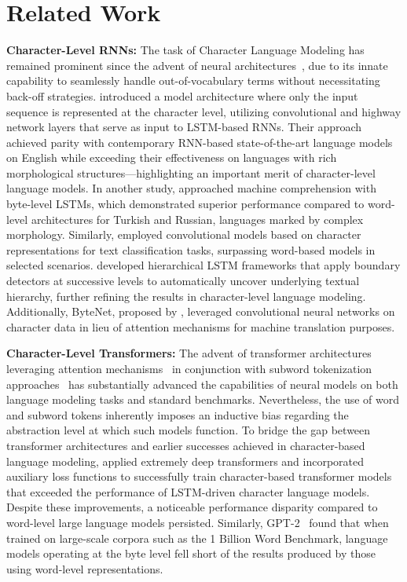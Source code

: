 \section{Related Work}
\label{section:related_work}

\textbf{Character-Level RNNs:} The task of Character Language Modeling has remained prominent since the advent of neural architectures~\citep{sutskever2011generating,mikolov2012subword,graves2013generating}, due to its innate capability to seamlessly handle out-of-vocabulary terms without necessitating back-off strategies. \cite{kim2016character} introduced a model architecture where only the input sequence is represented at the character level, utilizing convolutional and highway network layers that serve as input to LSTM-based RNNs. Their approach achieved parity with contemporary RNN-based state-of-the-art language models on English while exceeding their effectiveness on languages with rich morphological structures—highlighting an important merit of character-level language models. In another study, \cite{kenter2018byte} approached machine comprehension with byte-level LSTMs, which demonstrated superior performance compared to word-level architectures for Turkish and Russian, languages marked by complex morphology. Similarly, \cite{zhang2015character} employed convolutional models based on character representations for text classification tasks, surpassing word-based models in selected scenarios. \citet{chung2019hierarchical} developed hierarchical LSTM frameworks that apply boundary detectors at successive levels to automatically uncover underlying textual hierarchy, further refining the results in character-level language modeling. Additionally, ByteNet, proposed by \cite{kalchbrenner2016neural}, leveraged convolutional neural networks on character data in lieu of attention mechanisms for machine translation purposes.

\textbf{Character-Level Transformers:} The advent of transformer architectures leveraging attention mechanisms~\citep{vaswani2017attention} in conjunction with subword tokenization approaches~\citep{sennrich-etal-2016-neural} has substantially advanced the capabilities of neural models on both language modeling tasks and standard benchmarks. Nevertheless, the use of word and subword tokens inherently imposes an inductive bias regarding the abstraction level at which such models function. To bridge the gap between transformer architectures and earlier successes achieved in character-based language modeling, \citet{al2019character} applied extremely deep transformers and incorporated auxiliary loss functions to successfully train character-based transformer models that exceeded the performance of LSTM-driven character language models. Despite these improvements, a noticeable performance disparity compared to word-level large language models persisted. Similarly, GPT-2~\citep{radfordgpt2} found that when trained on large-scale corpora such as the 1 Billion Word Benchmark, language models operating at the byte level fell short of the results produced by those using word-level representations.

